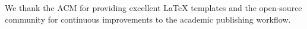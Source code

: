 
\begin{acks}
We thank the ACM for providing excellent LaTeX templates and the open-source community 
for continuous improvements to the academic publishing workflow.
\end{acks} 